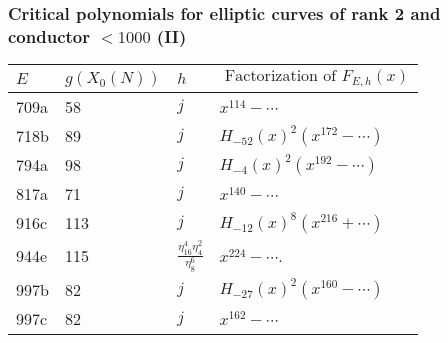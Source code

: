 \documentclass[handout]{beamer}
\begin{document}
\begin{frame}
\frametitle{Critical polynomials for elliptic curves of rank 2 and conductor $<1000$ (II)}   \begin{table}[h!]
    \begin{tabular}{ | l | l | l |p{4.4cm} |}
    \hline
    $E$ & $g(X_0(N))$    & $h$ & $\mbox{ Factorization of } F_{E,h}(x)$     \\ \hline \hline
    709a& 58  & $j$ &  $x^{114} - \cdots$\\ \hline
    718b& 89  & $j$ &  $ H_{-52}(x)^2 (x^{172} - \cdots)$\\ \hline
    794a& 98  & $j$ &  $H_{-4}(x)^2 (x^{192} - \cdots)$\\ \hline
    817a& 71  & $j$ &  $x^{140} - \cdots$\\ \hline
    
    916c & 113   & $j$ &$H_{-12}(x)^8(x^{216}+\cdots)$  \\ \hline
    
    
    944e & 115    & $\frac{\eta_{16}^4 \eta_{4}^2}{\eta_8^6}$ & $x^{224} - \cdots$.\footnotemark \\ \hline 
    997b& 82  & $j$ &  $H_{-27}(x)^2 (x^{160} - \cdots)$\\ \hline
    997c& 82  & $j$ &  $x^{162} - \cdots$\\ \hline
    \end{tabular}
    \label{table: rank two}	
   \end{table}

\end{frame}



\end{document}
